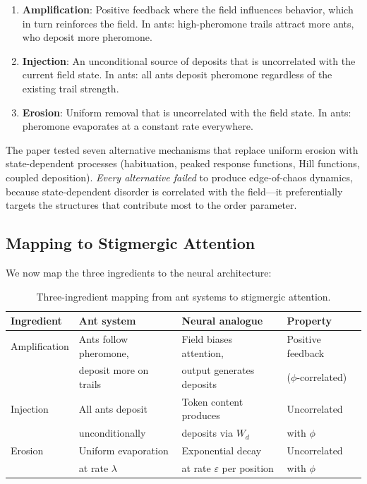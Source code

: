 \documentclass[11pt,a4paper]{article}
\newcommand{\evap}{\varepsilon}
\begin{document}
\begin{enumerate}
    \item \textbf{Amplification}: Positive feedback where the field
          influences behavior, which in turn reinforces the field.
          In ants: high-pheromone trails attract more ants, who deposit
          more pheromone.
    \item \textbf{Injection}: An unconditional source of deposits that
          is uncorrelated with the current field state. In ants: all ants
          deposit pheromone regardless of the existing trail strength.
    \item \textbf{Erosion}: Uniform removal that is uncorrelated with the
          field state. In ants: pheromone evaporates at a constant rate
          everywhere.
\end{enumerate}

The paper tested seven alternative mechanisms that replace uniform erosion
with state-dependent processes (habituation, peaked response functions,
Hill functions, coupled deposition). \emph{Every alternative failed} to
produce edge-of-chaos dynamics, because state-dependent disorder is
correlated with the field---it preferentially targets the structures that
contribute most to the order parameter.

\subsection{Mapping to Stigmergic Attention}

We now map the three ingredients to the neural architecture:

\begin{table}[h]
\centering
\begin{tabular}{@{}llll@{}}
\toprule
\textbf{Ingredient} & \textbf{Ant system} & \textbf{Neural analogue} & \textbf{Property} \\
\midrule
Amplification & Ants follow pheromone, & Field biases attention, & Positive feedback \\
              & deposit more on trails & output generates deposits & ($\phi$-correlated) \\
\addlinespace
Injection     & All ants deposit & Token content produces & Uncorrelated \\
              & unconditionally & deposits via $W_d$ & with $\phi$ \\
\addlinespace
Erosion       & Uniform evaporation & Exponential decay & Uncorrelated \\
              & at rate $\lambda$ & at rate $\evap$ per position & with $\phi$ \\
\bottomrule
\end{tabular}
\caption{Three-ingredient mapping from ant systems to stigmergic attention.}
\label{tab:ingredients}
\end{table}
\end{document}
